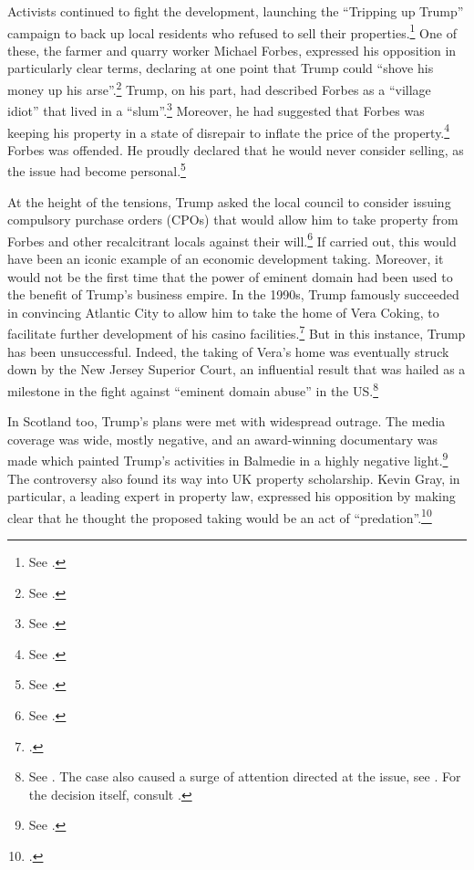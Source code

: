 Activists continued to fight the development, launching the ``Tripping up Trump'' campaign to back up local residents who refused to sell their properties.\footnote{See \cite{tripping15}.} One of these, the farmer and quarry worker Michael Forbes, expressed his opposition in particularly clear terms, declaring at one point that Trump could ``shove his money up his arse''.\footnote{See \cite{scotsman10}.} Trump, on his part, had described Forbes as a ``village idiot'' that lived in a ``slum''.\footnote{See \cite{bbc10}.} Moreover, he had suggested that Forbes was keeping his property in a state of disrepair to inflate the price of the property.\footnote{See \cite{cnn07}.} Forbes was offended. He proudly declared that he would never consider selling, as the issue had become personal.\footnote{See \cite{ferguson12}.}

At the height of the tensions, Trump asked the local council to consider issuing compulsory purchase orders (CPOs) that would allow him to take property from Forbes and other recalcitrant locals against their will.\footnote{See \cite{macaskill09}.} If carried out, this would have been an iconic example of an economic development taking. Moreover, it would not be the first time that the power of eminent domain had been used to the benefit of  Trump's business empire. In the 1990s, Trump famously succeeded in convincing Atlantic City to allow him to take the home of Vera Coking, to facilitate further development of his casino facilities.\footcite[297-301]{jones00} But in this instance, Trump has been unsuccessful. Indeed, the taking of Vera's home was eventually struck down by the New Jersey Superior Court, an influential result that was hailed as a milestone in the fight against ``eminent domain abuse'' in the US.\footnote{See \cite{institute15}. The case also caused a surge of attention directed at the issue, see \cite{gillespie08}. For the decision itself, consult \cite{banin98}.}

In Scotland too, Trump's plans were met with widespread outrage. The media coverage was wide, mostly negative, and an award-winning documentary was made which painted Trump's activities in Balmedie in a highly negative light.\footnote{See \cite{baxter11}.} The controversy also found its way into UK property scholarship. Kevin Gray, in particular, a leading expert in property law, expressed his opposition by making clear that he thought the proposed taking would be an act of ``predation''.\footcite{gray11}

